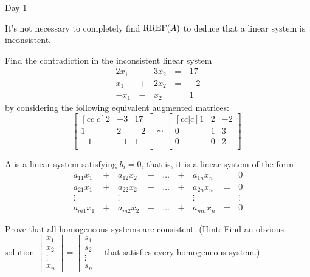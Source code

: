 \begin{applicationActivities}{Day 1}
\begin{remark}
  It's not necessary to completely find \(\operatorname{RREF}(A)\) to
  deduce that a linear system is inconsistent.
\end{remark}

\begin{activity}{0}
  Find the contradiction in the inconsistent linear system
    \begin{alignat*}{4}
      2x_1 &\,-\,& 3x_2 &\,=\,& 17 \\
       x_1 &\,+\,& 2x_2 &\,=\,& -2 \\
      -x_1 &\,-\,&  x_2 &\,=\,& 1
    \end{alignat*}
  by considering the following equivalent augmented matrices:
  \[
    \begin{bmatrix}[cc|c]
       2 & -3 & 17 \\
       1 &  2 & -2 \\
      -1 & -1 &  1 \\
    \end{bmatrix}\sim
    \begin{bmatrix}[cc|c]
       1 &  2 & -2 \\
       0 &  1 &  3 \\
       0 &  0 &  2 \\
    \end{bmatrix}
  .\]
\end{activity}

\begin{definition}
  A  is a linear system satisfying \(b_i=0\), that is,
  it is a linear system of the form
  \begin{alignat*}{5}
    a_{11}x_1 &\,+\,& a_{12}x_2 &\,+\,& \dots  &\,+\,& a_{1n}x_n &\,=\,& 0 \\
    a_{21}x_1 &\,+\,& a_{22}x_2 &\,+\,& \dots  &\,+\,& a_{2n}x_n &\,=\,& 0 \\
     \vdots&  &\vdots&   &&  &\vdots&&\vdots  \\
    a_{m1}x_1 &\,+\,& a_{m2}x_2 &\,+\,& \dots  &\,+\,& a_{mn}x_n &\,=\,& 0
  \end{alignat*}
\end{definition}

\begin{activity}{0}
  Prove that all homogeneous systems are consistent.
  (Hint: Find an obvious solution
  \(
    \begin{bmatrix}
      x_1 \\
      x_2 \\
      \vdots \\
      x_n
    \end{bmatrix}=
    \begin{bmatrix}
      s_1 \\
      s_2 \\
      \vdots \\
      s_n
    \end{bmatrix}
  \) that satisfies every homogeneous
  system.)
\end{activity}


\end{applicationActivities}
